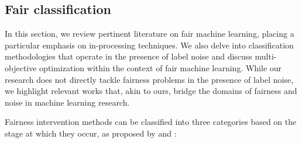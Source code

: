 




\subsection{Fair classification}

In this section, we review pertinent literature on fair machine learning, placing a particular emphasis on in-processing techniques. We also delve into classification methodologies that operate in the presence of label noise and discuss multi-objective optimization within the context of fair machine learning. While our research does not directly tackle fairness problems in the presence of label noise, we highlight relevant works that, akin to ours, bridge the domains of fairness and noise in machine learning research. 

Fairness intervention methods can be classified into three categories based on the stage at which they occur, as proposed by \cite{Mehrabi2019} and \cite{AlerTubella2022}:

